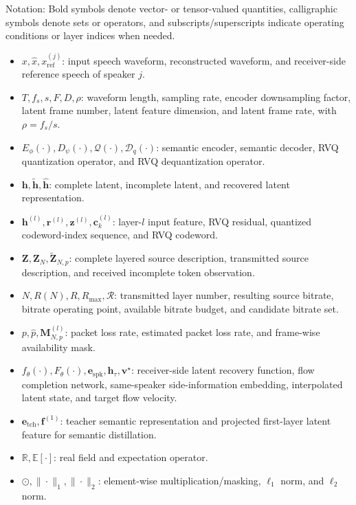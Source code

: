 \documentclass[conference]{IEEEtran}
\begin{document}
Notation: Bold symbols denote vector- or tensor-valued quantities, calligraphic symbols denote sets or operators, and subscripts/superscripts indicate operating conditions or layer indices when needed.
\begin{itemize}
\item $x,\hat{x},x_{\mathrm{ref}}^{(j)}$: input speech waveform, reconstructed waveform, and receiver-side reference speech of speaker $j$.
\item $T,f_s,s,F,D,\rho$: waveform length, sampling rate, encoder downsampling factor, latent frame number, latent feature dimension, and latent frame rate, with $\rho=f_s/s$.
\item $E_{\phi}(\cdot),D_{\psi}(\cdot),\mathcal{Q}(\cdot),\mathcal{D}_{q}(\cdot)$: semantic encoder, semantic decoder, RVQ quantization operator, and RVQ dequantization operator.
\item $\mathbf{h},\widetilde{\mathbf{h}},\widehat{\mathbf{h}}$: complete latent, incomplete latent, and recovered latent representation.
\item $\mathbf{h}^{(l)},\mathbf{r}^{(l)},\mathbf{z}^{(l)},\mathbf{c}^{(l)}_{k}$: layer-$l$ input feature, RVQ residual, quantized codeword-index sequence, and RVQ codeword.
\item $\mathbf{Z},\mathbf{Z}_{N},\tilde{\mathbf{Z}}_{N,p}$: complete layered source description, transmitted source description, and received incomplete token observation.
\item $N,R(N),R,R_{\max},\mathcal{R}$: transmitted layer number, resulting source bitrate, bitrate operating point, available bitrate budget, and candidate bitrate set.
\item $p,\hat{p},\mathbf{M}^{(l)}_{N,p}$: packet loss rate, estimated packet loss rate, and frame-wise availability mask.
\item $f_{\theta}(\cdot),F_{\theta}(\cdot),\mathbf{e}_{\mathrm{spk}},\mathbf{h}_{\tau},\mathbf{v}^{\star}$: receiver-side latent recovery function, flow completion network, same-speaker side-information embedding, interpolated latent state, and target flow velocity.
\item $\mathbf{e}_{\mathrm{tch}},\mathbf{f}^{(1)}$: teacher semantic representation and projected first-layer latent feature for semantic distillation.
\item $\mathbb{R},\mathbb{E}[\cdot]$: real field and expectation operator.
\item $\odot,\|\cdot\|_1,\|\cdot\|_2$: element-wise multiplication/masking, $\ell_1$ norm, and $\ell_2$ norm.
\end{itemize}
\end{document}
